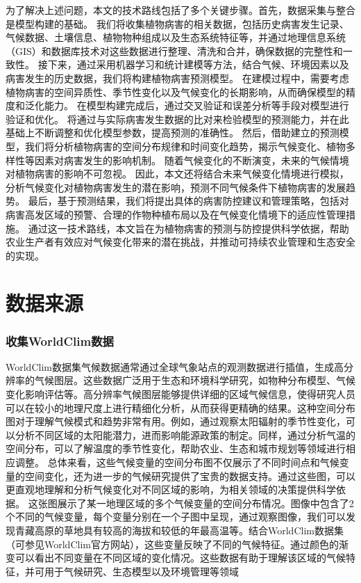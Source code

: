 \documentclass[AutoFakeBold]{LZUThesis-PgD&PhD}
\begin{document}
	
	为了解决上述问题，本文的技术路线包括了多个关键步骤。首先，数据采集与整合是模型构建的基础。
	我们将收集植物病害的相关数据，包括历史病害发生记录、气候数据、土壤信息、植物物种组成以及生态系统特征等，并通过地理信息系统（GIS）和数据库技术对这些数据进行整理、清洗和合并，确保数据的完整性和一致性。
	接下来，通过采用机器学习和统计建模等方法，结合气候、环境因素以及病害发生的历史数据，我们将构建植物病害预测模型。
	在建模过程中，需要考虑植物病害的空间异质性、季节性变化以及气候变化的长期影响，从而确保模型的精度和泛化能力。
	在模型构建完成后，通过交叉验证和误差分析等手段对模型进行验证和优化。
	将通过与实际病害发生数据的比对来检验模型的预测能力，并在此基础上不断调整和优化模型参数，提高预测的准确性。
	然后，借助建立的预测模型，我们将分析植物病害的空间分布规律和时间变化趋势，揭示气候变化、植物多样性等因素对病害发生的影响机制。
	随着气候变化的不断演变，未来的气候情境对植物病害的影响不可忽视。
	因此，本文还将结合未来气候变化情境进行模拟，分析气候变化对植物病害发生的潜在影响，预测不同气候条件下植物病害的发展趋势。
	最后，基于预测结果，我们将提出具体的病害防控建议和管理策略，包括对病害高发区域的预警、合理的作物种植布局以及在气候变化情境下的适应性管理措施。
	通过这一技术路线，本文旨在为植物病害的预测与防控提供科学依据，帮助农业生产者有效应对气候变化带来的潜在挑战，并推动可持续农业管理和生态安全的实现。
	
	\chapter{数据来源}
	
	\subsection{收集WorldClim数据}
	
	WorldClim数据集气候数据通常通过全球气象站点的观测数据进行插值，生成高分辨率的气候图层。这些数据广泛用于生态和环境科学研究，如物种分布模型、气候变化影响评估等。高分辨率气候图层能够提供详细的区域气候信息，使得研究人员可以在较小的地理尺度上进行精细化分析，从而获得更精确的结果。这种空间分布图对于理解气候模式和趋势非常有用。例如，通过观察太阳辐射的季节性变化，可以分析不同区域的太阳能潜力，进而影响能源政策的制定。同样，通过分析气温的空间分布，可以了解温度的季节性变化，帮助农业、生态和城市规划等领域进行相应调整。
	总体来看，这些气候变量的空间分布图不仅展示了不同时间点和气候变量的空间变化，还为进一步的气候研究提供了宝贵的数据支持。通过这些图，可以更直观地理解和分析气候变化对不同区域的影响，为相关领域的决策提供科学依据。 这张图展示了某一地理区域的多个气候变量的空间分布情况。图像中包含了2个不同的气候变量，每个变量分别在一个子图中呈现，通过观察图像，我们可以发现青藏高原的草地具有较高的海拔和较低的年最高温等。结合WorldClim数据集（可参见WorldClim官方网站），这些变量反映了不同的气候特征。通过颜色的渐变可以看出不同变量在不同区域的变化情况。这些数据有助于理解该区域的气候特征，并可用于气候研究、生态模型以及环境管理等领域
	
\end{document}
